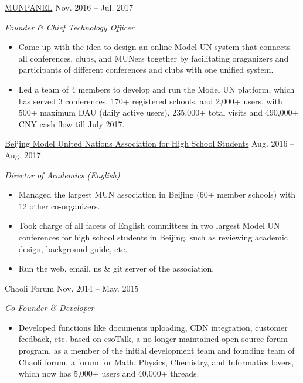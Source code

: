 \documentclass[hidelinks__VERSION__]{adamyi-cv}
\begin{document}
\begin{entrylist}
\entry
{\href{https://www.munpanel.com}{MUNPANEL}}
{Nov. 2016 -- Jul. 2017}
{\emph{Founder \& Chief Technology Officer}
\begin{itemize}
\item Came up with the idea to design an online Model UN system that connects all conferences, clubs, and MUNers together by facilitating oraganizers and participants of different conferences and clubs with one unified system.
\item Led a team of 4 members to develop and run the Model UN platform, which has served 3 conferences, 170+ registered schools, and 2,000+ users, with 500+ maximum DAU (daily active users), 235,000+ total visits and 490,000+ CNY cash flow till July 2017.
\end{itemize}}


\entry
{\href{https://bjmun.org}{Beijing Model United Nations Association for High School Students}}
{Aug. 2016 -- Aug. 2017}
{\emph{Director of Academics (English)}
\begin{itemize}
\item Managed the largest MUN association in Beijing (60+ member schools) with 12 other co-organizers.
\item Took charge of all facets of English committees in two largest Model UN conferences for high school students in Beijing, such as reviewing academic design, background guide, etc.
\item Run the web, email, ns \& git server of the association.
\end{itemize}}


\entry
{Chaoli Forum}
{Nov. 2014 -- May. 2015}
{\emph{Co-Founder \& Developer}
\begin{itemize}
\item Developed functions like documents uploading, CDN integration, customer feedback, etc. based on esoTalk, a no-longer maintained open source forum program, as a member of the initial development team and founding team of Chaoli forum, a forum for Math, Physics, Chemistry, and Informatics lovers, which now has 5,000+ users and 40,000+ threads.
\end{itemize}}




\end{entrylist}
\end{document}
